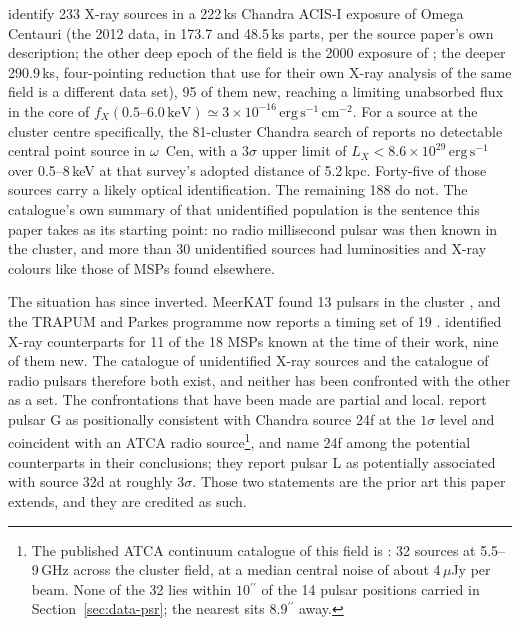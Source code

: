 \documentclass[11pt]{article}
\newcommand{\ocen}{$\omega$~Cen}
\newcommand{\as}{\ensuremath{^{\prime\prime}}}
\begin{document}
\citet{Henleywillis2018} identify 233 X-ray sources in a 222\,ks Chandra ACIS-I exposure of Omega Centauri (the 2012 data, in 173.7 and 48.5\,ks parts, per the source paper's own description; the other deep epoch of the field is the 2000 exposure of \citealt{Haggard2009}; the deeper 290.9\,ks, four-pointing reduction that \citet{ZhaoHeinke2023} use for their own X-ray analysis of the same field is a different data set), 95 of them new, reaching a limiting unabsorbed flux in the core of $f_X(0.5\text{--}6.0\,\mathrm{keV}) \simeq 3\times10^{-16}\,\mathrm{erg\,s^{-1}\,cm^{-2}}$. For a source at the cluster centre specifically, the 81-cluster Chandra search of \citet{Su2022} reports no detectable central point source in \ocen{}, with a $3\sigma$ upper limit of $L_X < 8.6\times10^{29}\,\mathrm{erg\,s^{-1}}$ over 0.5--8\,keV at that survey's adopted distance of 5.2\,kpc. Forty-five of those sources carry a likely optical identification. The remaining 188 do not. The catalogue's own summary of that unidentified population is the sentence this paper takes as its starting point: no radio millisecond pulsar was then known in the cluster, and more than 30 unidentified sources had luminosities and X-ray colours like those of MSPs found elsewhere.

The situation has since inverted. MeerKAT found 13 pulsars in the cluster \citep{Chen2023}, and the TRAPUM and Parkes programme now reports a timing set of 19 \citep{ColomiBernadich2026}. \citet{ZhaoHeinke2023} identified X-ray counterparts for 11 of the 18 MSPs known at the time of their work, nine of them new. The catalogue of unidentified X-ray sources and the catalogue of radio pulsars therefore both exist, and neither has been confronted with the other as a set. The confrontations that have been made are partial and local. \citet{ColomiBernadich2026} report pulsar G as positionally consistent with Chandra source 24f at the $1\sigma$ level and coincident with an ATCA radio source\footnote{The published ATCA continuum catalogue of this field is \citet{Tudor2022}: 32 sources at 5.5--9\,GHz across the cluster field, at a median central noise of about 4\,$\mu$Jy per beam. None of the 32 lies within $10\as$ of the 14 pulsar positions carried in Section~\ref{sec:data-psr}; the nearest sits $8.9\as$ away.}, and name 24f among the potential counterparts in their conclusions; they report pulsar L as potentially associated with source 32d at roughly $3\sigma$. Those two statements are the prior art this paper extends, and they are credited as such.
\end{document}
